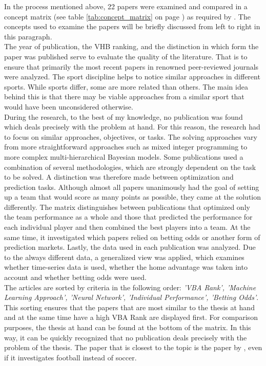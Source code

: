 In the process mentioned above, 22 papers were examined and compared in a concept matrix (see table \ref{tab:concept_matrix} on page \pageref{tab:concept_matrix}) as required by \citet{webster_guest_2002}. The concepts used to examine the papers will be briefly discussed from left to right in this paragraph. \\
\indent The year of publication, the VHB ranking, and the distinction in which form the paper was published serve to evaluate the quality of the literature. That is to ensure that primarily the most recent papers in renowned peer-reviewed journals were analyzed. The sport discipline helps to notice similar approaches in different sports. While sports differ, some are more related than others. The main idea behind this is that there may be viable approaches from a similar sport that would have been unconsidered otherwise.  \\
\indent During the research, to the best of my knowledge, no publication was found which deals precisely with the problem at hand. For this reason, the research had to focus on similar approaches, objectives, or tasks. The solving approaches vary from more straightforward approaches such as mixed integer programming to more complex multi-hierarchical Bayesian models. Some publications used a combination of several methodologies, which are strongly dependent on the task to be solved. A distinction was therefore made between optimization and prediction tasks. Although almost all papers unanimously had the goal of setting up a team that would score as many points as possible, they came at the solution differently. The matrix distinguishes between publications that optimized only the team performance as a whole and those that predicted the performance for each individual player and then combined the best players into a team. At the same time, it investigated which papers relied on betting odds or another form of prediction markets. Lastly, the data used in each publication was analyzed. Due to the always different data, a generalized view was applied, which examines whether time-series data is used, whether the home advantage was taken into account and whether betting odds were used. \\
\indent The articles are sorted by criteria in the following order: \emph{'VBA Rank', 'Machine Learning Approach', 'Neural Network', 'Individual Performance', 'Betting Odds'}. This sorting ensures that the papers that are most similar to the thesis at hand and at the same time have a high VBA Rank are displayed first. For comparison purposes, the thesis at hand can be found at the bottom of the matrix. In this way, it can be quickly recognized that no publication deals precisely with the problem of the thesis. The paper that is closest to the topic is the paper by \citet{landers_machine_2017}, even if it investigates football instead of soccer.

